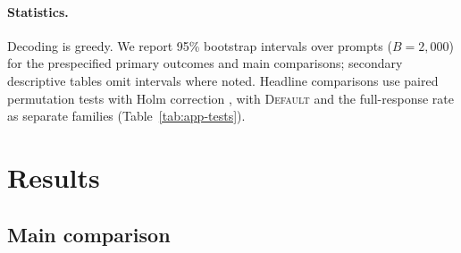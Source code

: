 \documentclass[11pt]{article}
\newcommand{\default}{\textsc{Default}\xspace}
\begin{document}
\paragraph{Statistics.}
Decoding is greedy. We report 95\% bootstrap intervals over prompts ($B=2{,}000$) for the prespecified primary outcomes and main comparisons; secondary descriptive tables omit intervals where noted. Headline comparisons use paired permutation tests with Holm correction \citep{holm1979simple}, with \default and the full-response rate as separate families (Table~\ref{tab:app-tests}).

\section{Results}
\label{sec:results}

\subsection{Main comparison}
\label{subsec:main}
\end{document}
